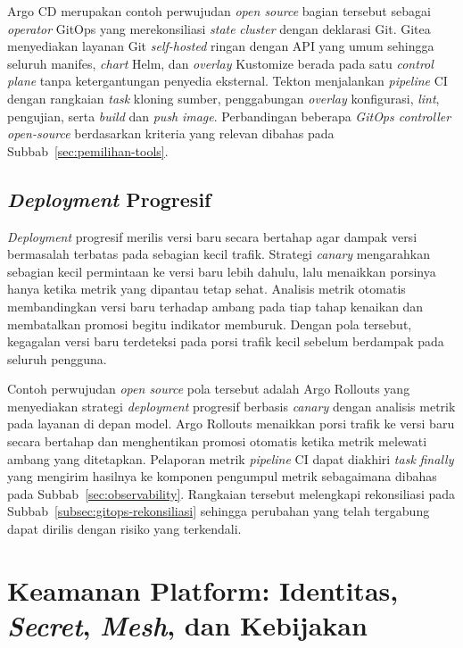 Argo CD \autocite{argocd2024} merupakan contoh perwujudan \textit{open source} bagian tersebut sebagai \textit{operator} GitOps yang merekonsiliasi \textit{state} \textit{cluster} dengan deklarasi Git. Gitea \autocite{gitea2025} menyediakan layanan Git \textit{self-hosted} ringan dengan API yang umum sehingga seluruh manifes, \textit{chart} Helm, dan \textit{overlay} Kustomize berada pada satu \textit{control plane} tanpa ketergantungan penyedia eksternal. Tekton \autocite{tekton2024} menjalankan \textit{pipeline} CI dengan rangkaian \textit{task} kloning sumber, penggabungan \textit{overlay} konfigurasi, \textit{lint}, pengujian, serta \textit{build} dan \textit{push} \textit{image}. Perbandingan beberapa \textit{GitOps controller} \textit{open-source} berdasarkan kriteria yang relevan dibahas pada Subbab~\ref{sec:pemilihan-tools}.

\subsection{\textit{Deployment} Progresif}
\label{subsec:gitops-progresif}

\textit{Deployment} progresif merilis versi baru secara bertahap agar dampak versi bermasalah terbatas pada sebagian kecil trafik. Strategi \textit{canary} mengarahkan sebagian kecil permintaan ke versi baru lebih dahulu, lalu menaikkan porsinya hanya ketika metrik yang dipantau tetap sehat. Analisis metrik otomatis membandingkan versi baru terhadap ambang pada tiap tahap kenaikan dan membatalkan promosi begitu indikator memburuk. Dengan pola tersebut, kegagalan versi baru terdeteksi pada porsi trafik kecil sebelum berdampak pada seluruh pengguna.

Contoh perwujudan \textit{open source} pola tersebut adalah Argo Rollouts \autocite{argorollouts2025} yang menyediakan strategi \textit{deployment} progresif berbasis \textit{canary} dengan analisis metrik pada layanan di depan model. Argo Rollouts menaikkan porsi trafik ke versi baru secara bertahap dan menghentikan promosi otomatis ketika metrik melewati ambang yang ditetapkan. Pelaporan metrik \textit{pipeline} CI dapat diakhiri \textit{task} \textit{finally} yang mengirim hasilnya ke komponen pengumpul metrik sebagaimana dibahas pada Subbab~\ref{sec:observability}. Rangkaian tersebut melengkapi rekonsiliasi pada Subbab~\ref{subsec:gitops-rekonsiliasi} sehingga perubahan yang telah tergabung dapat dirilis dengan risiko yang terkendali.


\section{Keamanan Platform: Identitas, \textit{Secret}, \textit{Mesh}, dan Kebijakan}
\label{sec:keamanan-platform}

